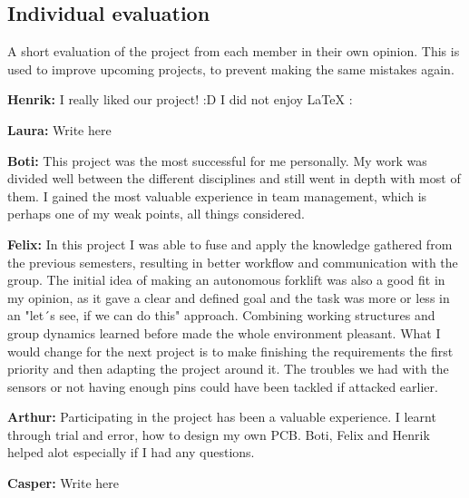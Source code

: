 \documentclass[../report.tex]{subfiles}
\begin{document}
\subsection{Individual evaluation}
A short evaluation of the project from each member in their own opinion. This is used to improve
upcoming projects, to prevent making the same mistakes again.

\textbf{Henrik:}
I really liked our project! :D I did not enjoy LaTeX :%

\textbf{Laura:}
Write here

\textbf{Boti:}
This project was the most successful for me personally. My work was divided well between the different disciplines
and still went in depth with most of them. I gained the most valuable experience in team management, which is perhaps one of
my weak points, all things considered.

\textbf{Felix:}
In this project I was able to fuse and apply the knowledge gathered from the previous semesters, resulting in better 
workflow and communication with the group. The initial idea of making an autonomous forklift was also a good fit 
in my opinion, as it gave a clear and defined goal and the task was more or less in an "let´s see, if we can do this" 
approach. Combining working structures and group dynamics learned before made the whole environment pleasant.  What I would 
change for the next project is to make finishing the requirements the first priority and then adapting the project around it. 
The troubles we had with the sensors or not having enough pins could have been tackled if attacked earlier.



\textbf{Arthur:}
Participating in the project has been a valuable experience. I learnt through trial and error, how to design my own PCB. Boti, Felix and Henrik helped alot especially if I had any questions. 


\textbf{Casper:}
Write here
\end{document}
